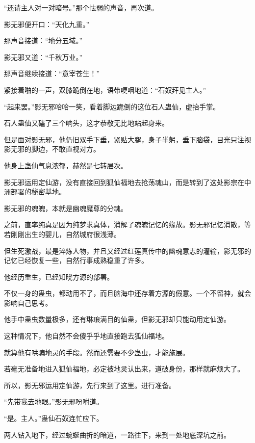 
\begin{this_body}



“还请主人对一对暗号。”那个怯弱的声音，再次道。

影无邪便开口：“天化九重。”

那声音接道：“地分五域。”

影无邪又道：“千秋万业。”

那声音继续接道：“意宰苍生！”

紧接着啪的一声，双膝跪倒在地，语带哽咽地道：“石奴拜见主人。”

“起来罢。”影无邪哈哈一笑，看着脚边跪倒的这位石人蛊仙，虚抬手掌。

石人蛊仙又磕了三个响头，这才恭敬无比地站起身来。

但是面对影无邪，他仍旧双手下垂，紧贴大腿，身子半躬，垂下脑袋，目光只注视影无邪的脚边，不敢直视对方。

他身上蛊仙气息浓郁，赫然是七转层次。

影无邪运用定仙游，没有直接回到狐仙福地去抢荡魂山，而是转到了这处影宗在中洲部署的秘密基地。

影无邪的魂魄，本就是幽魂魔尊的分魂。

之前，直率纯真是因为纯梦求真体，消解了魂魄记忆的缘故。影无邪记忆消散，等若刚刚出生的婴儿，自然城府很浅薄。

但生死激战，最是淬炼人物，并且又经过红莲真传中的幽魂意志的灌输，影无邪的记忆已经恢复一些，自然行事成熟稳重了许多。

他经历重生，已经知晓方源的部署。

不仅一身的蛊虫，都动用不了，而且脑海中还存着方源的假意。一个不留神，就会影响自己思考。

他手中蛊虫数量极多，还有琳琅满目的仙蛊，但影无邪却只能动用定仙游。

这种情况下，他自然不会傻乎乎地直接跑去狐仙福地。

就算他有哄骗地灵的手段。然而还需要不少蛊虫，才能施展。

若毫无准备地进入狐仙福地，必定被地灵认出来，道破身份，那样就麻烦大了。

所以，影无邪运用定仙游，先行来到了这里。进行准备。

“先带我去地眼。”影无邪吩咐道。

“是。主人。”蛊仙石奴连忙应下。

两人钻入地下，经过蜿蜒曲折的暗道，一路往下，来到一处地底深坑之前。


\end{this_body}
